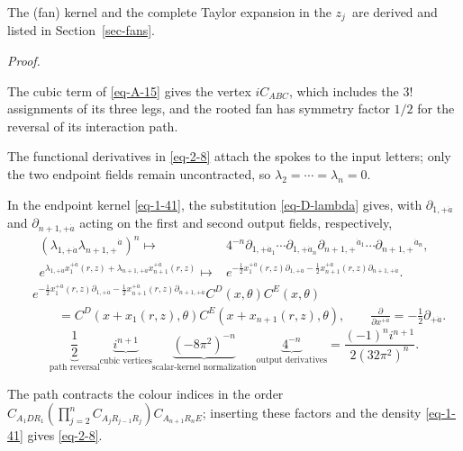 \documentclass[11pt]{article}
\numberwithin{equation}{section}
\numberwithin{figure}{section}
\numberwithin{table}{section}
\begin{document}
The (fan) kernel and the complete Taylor expansion in the $z_j$~are derived and listed in Section~\ref{sec-fans}.

\emph{Proof.}

The cubic term of \eqref{eq-A-15} gives the vertex $iC_{ABC}$, which includes the $3!$ assignments of its three legs, and the rooted fan has symmetry factor $1/2$ for the reversal of its interaction path.

The functional derivatives in \eqref{eq-2-8} attach the spokes to the input letters; only the two endpoint fields remain uncontracted, so $\lambda_2=\cdots=\lambda_n=0$.

In the endpoint kernel \eqref{eq-1-41}, the substitution \eqref{eq-D-lambda} gives, with $\partial_{1,+\dot a}$ and $\partial_{n+1,+\dot a}$ acting on the first and second output fields, respectively,
\begin{equation*}
\begin{aligned}
(\lambda_{1,+\dot a}\lambda_{n+1,+}{}^{\dot a})^n
\longmapsto{}&4^{-n}
\partial_{1,+\dot a_1}\cdots\partial_{1,+\dot a_n}
\partial_{n+1,+}{}^{\dot a_1}\cdots\partial_{n+1,+}{}^{\dot a_n},\\
e^{\lambda_{1,+\dot a}x_1^{+\dot a}(r,z)+
\lambda_{n+1,+\dot a}x_{n+1}^{+\dot a}(r,z)}
\longmapsto{}&
e^{-\frac12x_1^{+\dot a}(r,z)\partial_{1,+\dot a}
-\frac12x_{n+1}^{+\dot a}(r,z)\partial_{n+1,+\dot a}}.
\end{aligned}
\end{equation*}
\begin{equation*}
\begin{aligned}
&e^{-\frac12x_1^{+\dot a}(r,z)\partial_{1,+\dot a}
-\frac12x_{n+1}^{+\dot a}(r,z)\partial_{n+1,+\dot a}}
C^D(x,\theta)C^E(x,\theta)\\
&\qquad=C^D(x+x_1(r,z),\theta)C^E(x+x_{n+1}(r,z),\theta),
\qquad \frac{\partial}{\partial x^{+\dot a}}=-\frac12\partial_{+\dot a}.
\end{aligned}
\end{equation*}
\begin{equation*}
\underbrace{\frac12}_{\text{path reversal}}
\underbrace{i^{n+1}}_{\text{cubic vertices}}
\underbrace{(-8\pi^2)^{-n}}_{\text{scalar-kernel normalization}}
\underbrace{4^{-n}}_{\text{output derivatives}}
=\frac{(-1)^ni^{n+1}}{2(32\pi^2)^n}.
\end{equation*}

The path contracts the colour indices in the order $C_{A_1DR_1}(\prod_{j=2}^{n}C_{A_jR_{j-1}R_j})C_{A_{n+1}R_nE}$; inserting these factors and the density \eqref{eq-1-41} gives \eqref{eq-2-8}.\hfill\qedsymbol
\end{document}
